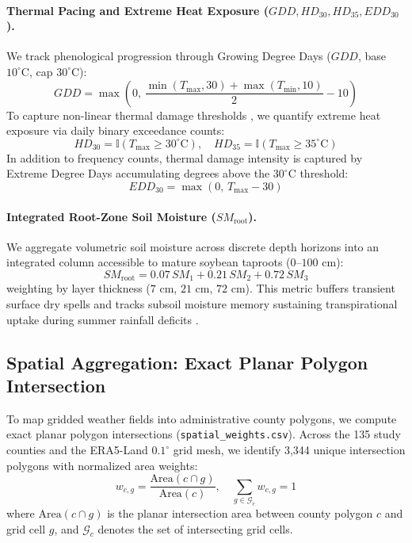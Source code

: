\paragraph{Thermal Pacing and Extreme Heat Exposure ($GDD, HD_{30}, HD_{35}, EDD_{30}$).} We track phenological progression through Growing Degree Days ($GDD$, base $10^\circ\text{C}$, cap $30^\circ\text{C}$):
\begin{equation}
    GDD = \max\left(0, \, \frac{\min(T_{\text{max}}, 30) + \max(T_{\text{min}}, 10)}{2} - 10\right)
    \label{eq:gdd}
\end{equation}
To capture non-linear thermal damage thresholds \citep{Schlenker2009}, we quantify extreme heat exposure via daily binary exceedance counts:
\begin{equation}
    HD_{30} = \mathbb{I}(T_{\text{max}} \ge 30^\circ\text{C}), \quad HD_{35} = \mathbb{I}(T_{\text{max}} \ge 35^\circ\text{C})
    \label{eq:heat_days}
\end{equation}
In addition to frequency counts, thermal damage intensity is captured by Extreme Degree Days accumulating degrees above the $30^\circ\text{C}$ threshold:
\begin{equation}
    EDD_{30} = \max\left(0, \, T_{\text{max}} - 30\right)
    \label{eq:edd30}
\end{equation}

\paragraph{Integrated Root-Zone Soil Moisture ($SM_{\text{root}}$).} We aggregate volumetric soil moisture across discrete depth horizons into an integrated column accessible to mature soybean taproots ($0$--$100\text{ cm}$):
\begin{equation}
    SM_{\text{root}} = 0.07 \, SM_1 + 0.21 \, SM_2 + 0.72 \, SM_3
    \label{eq:sm_root}
\end{equation}
weighting by layer thickness ($7\text{ cm}$, $21\text{ cm}$, $72\text{ cm}$). This metric buffers transient surface dry spells and tracks subsoil moisture memory sustaining transpirational uptake during summer rainfall deficits \citep{Vijverberg2023}.

\subsection{Spatial Aggregation: Exact Planar Polygon Intersection}
\label{sec:data_spatial_aggregation}

To map gridded weather fields into administrative county polygons, we compute exact planar polygon intersections (\texttt{spatial\_weights.csv}). Across the 135 study counties and the ERA5-Land $0.1^\circ$ grid mesh, we identify 3,344 unique intersection polygons with normalized area weights:
\begin{equation}
    w_{c,g} = \frac{\text{Area}(c \cap g)}{\text{Area}(c)}, \quad \sum_{g \in \mathcal{G}_c} w_{c,g} = 1
    \label{eq:spatial_weight}
\end{equation}
where $\text{Area}(c \cap g)$ is the planar intersection area between county polygon $c$ and grid cell $g$, and $\mathcal{G}_c$ denotes the set of intersecting grid cells.

